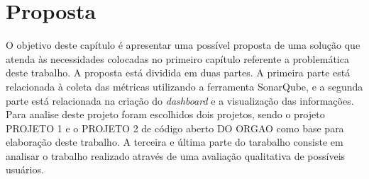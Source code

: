 \chapter[Proposta]{Proposta}
O objetivo deste capítulo é apresentar uma possível proposta de uma solução que atenda às necessidades colocadas no primeiro capítulo referente a problemática deste trabalho. A proposta está dividida em duas partes. A primeira parte está relacionada à coleta das métricas utilizando a ferramenta SonarQube, e a segunda parte está relacionada na criação do \textit{dashboard} e a visualização das informações. Para analise deste projeto foram escolhidos dois projetos, sendo o projeto PROJETO 1 e o PROJETO 2 de código aberto DO ORGAO como base para elaboração deste trabalho. A terceira e última parte do tarabalho consiste em analisar o trabalho realizado através de uma avaliação qualitativa de possíveis usuários.
